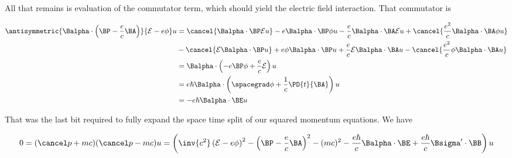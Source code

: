 All that remains is evaluation of the commutator term, which should yield the electric field interaction.  That commutator is

\begin{align*}
\antisymmetric{
\Balpha \cdot \left(\BP - \frac{e}{c} \BA \right) 
}
{
\mathcal{E} - e \phi 
} u
&=
\cancel{\Balpha \cdot \BP \mathcal{E} u}
- e \Balpha \cdot \BP \phi u
- \frac{e}{c} \Balpha \cdot \BA \mathcal{E} u
+ \cancel{\frac{e^2}{c} \Balpha \cdot \BA \phi u} \\
&
- \cancel{\mathcal{E} \Balpha \cdot \BP u}
+ e \phi \Balpha \cdot \BP u
+ \frac{e}{c} \mathcal{E} \Balpha \cdot \BA u
- \cancel{\frac{e^2}{c} \phi \Balpha \cdot \BA u} \\
&=
\Balpha \cdot \left( - e \BP \phi 
+ \frac{e}{c} \mathcal{E} \right) u \\
&=
e \hbar \Balpha \cdot \left( \spacegrad \phi 
+ \frac{1}{c} \PD{t}{\BA} \right) u \\
&= 
- e \hbar \Balpha \cdot \BE u
\end{align*}

That was the last bit required to fully expand the space time split of our squared momentum equations.  We have

\begin{equation}\label{eqn:diracGauge:n}
0
=
(\pslash + mc)(\pslash - mc) u
=
\left(
\inv{c^2} \left( \mathcal{E} - e \phi \right)^2
- \left(\BP - \frac{e}{c} \BA \right)^2
- (mc)^2 
- \frac{e \hbar}{c} \Balpha \cdot \BE 
+ \frac{e \hbar}{c} \Bsigma' \cdot \BB 
\right) u
\end{equation}

\EndArticle

